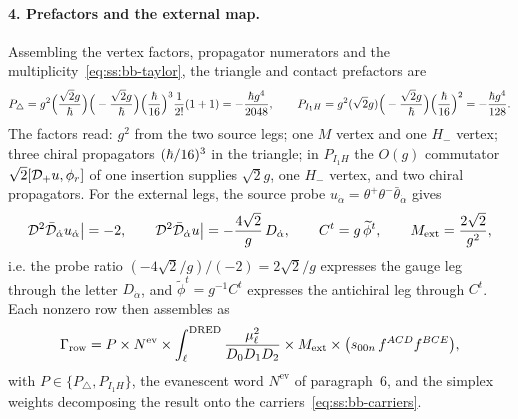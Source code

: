 \paragraph{4. Prefactors and the external map.} Assembling the vertex factors,
propagator numerators and the multiplicity~\eqref{eq:ss:bb-taylor}, the
triangle and contact prefactors are
\begin{equation}\label{eq:ss:bb-prefactors}
P_\triangle
=g^{2}\Big(\frac{\sqrt2 g}{\hbar}\Big)\Big(-\frac{\sqrt2 g}{\hbar}\Big)
\Big(\frac{\hbar}{16}\Big)^{3}\frac{1}{2!}(1+1)
=-\frac{\hbar g^{4}}{2048},
\qquad
P_{I_1H}
=g^{2}(\sqrt2 g)\Big(-\frac{\sqrt2 g}{\hbar}\Big)\Big(\frac{\hbar}{16}\Big)^{2}
=-\frac{\hbar g^{4}}{128}.
\end{equation}
The factors read: $g^2$ from the two source legs; one $M$ vertex and one $H_-$
vertex; three chiral propagators $(\hbar/16)^3$ in the triangle; in $P_{I_1H}$
the $O(g)$ commutator $\sqrt2[\mathcal{D}_+u,\phi_r]$ of one insertion supplies
$\sqrt2 g$, one $H_-$ vertex, and two chiral propagators. For the external
legs, the source probe $u_{\dot\alpha}=\theta^+\theta^-\bar\theta_{\dot\alpha}$
gives
\begin{equation}\label{eq:ss:bb-extmap}
\mathcal{D}^{2}\bar{\mathcal{D}}_{\dot\alpha}u_{\dot\alpha}\big|=-2,
\qquad
\mathcal{D}^{2}\bar{\mathcal{D}}_{\dot\alpha}u\big|=-\frac{4\sqrt2}{g}\,D_{\dot\alpha},
\qquad
C^{t}=g\,\widetilde\phi^{t},
\qquad
M_{\mathrm{ext}}=\frac{2\sqrt2}{g^{2}},
\end{equation}
i.e. the probe ratio $(-4\sqrt2/g)/(-2)=2\sqrt2/g$ expresses the gauge leg
through the letter $D_{\dot\alpha}$, and $\widetilde\phi^t=g^{-1}C^t$
expresses the antichiral leg through $C^t$. Each nonzero row then assembles as
\begin{equation}\label{eq:ss:bb-assembly}
\Gamma_{\mathrm{row}}
=P\times N^{\mathrm{ev}}\times
\int_{\ell}^{\mathrm{DRED}}\frac{\mu_\ell^{2}}{D_0D_1D_2}
\times M_{\mathrm{ext}}\times\big(s_{00n}\,f^{ACD}f^{BCE}\big),
\end{equation}
with $P\in\{P_\triangle,P_{I_1H}\}$, the evanescent word $N^{\mathrm{ev}}$ of
paragraph~6, and the simplex weights decomposing the result onto the
carriers~\eqref{eq:ss:bb-carriers}.

